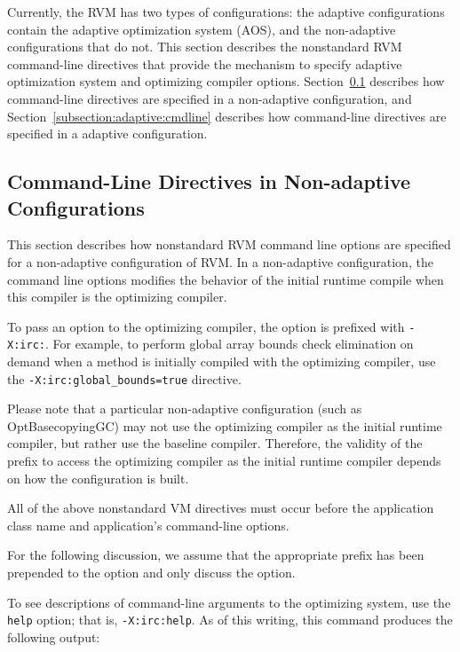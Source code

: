 
Currently, the RVM has two types of configurations:
the adaptive configurations contain the adaptive optimization system (AOS),
and the non-adaptive configurations that do not.  
This section describes the nonstandard RVM command-line directives that 
provide the mechanism to specify adaptive optimization system and optimizing
compiler options.
Section~\ref{subsection:nonadaptive:cmdline} describes how command-line 
directives are specified in a non-adaptive configuration, and 
Section~\ref{subsection:adaptive:cmdline} describes how command-line 
directives are specified in a adaptive configuration.

\subsection{Command-Line Directives in Non-adaptive Configurations}
\label{subsection:nonadaptive:cmdline}

This section describes how nonstandard RVM command line options are 
specified for a non-adaptive configuration of RVM.
In a non-adaptive configuration, the command line options modifies
the behavior of the initial runtime compile when this compiler
is the optimizing compiler.

To pass an option to the optimizing compiler, the option is prefixed
with {\tt -X:irc:}.
For example, to perform global array bounds check elimination on demand
when a method is initially compiled with the optimizing compiler,
use the {\tt -X:irc:global\_bounds=true} directive.

Please note that a particular non-adaptive configuration (such as
OptBasecopyingGC) may not use the 
optimizing compiler as the initial runtime compiler, but rather use the 
baseline compiler.
Therefore, the validity of the prefix to access the optimizing compiler
as the initial runtime compiler depends on how the configuration is built.

All of the above nonstandard VM directives must occur before 
the application class name and application's command-line options.

For the following discussion, we assume that the appropriate prefix has been
prepended to the option and only discuss the option.

To see descriptions of command-line arguments to the optimizing system, use
the {\tt help} option; that is, {\tt -X:irc:help}.  
As of this writing, this command produces the following output:



